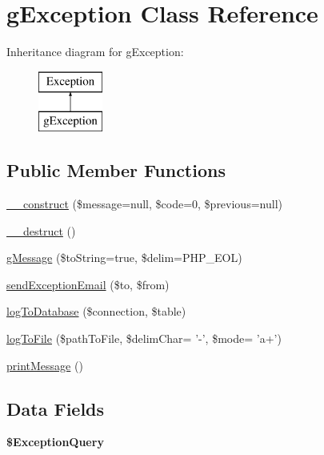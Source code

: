 \hypertarget{classg_exception}{\section{g\-Exception Class Reference}
\label{classg_exception}
}
Inheritance diagram for g\-Exception\-:\begin{figure}[H]
\begin{center}
\leavevmode
\includegraphics[height=2.000000cm]{classg_exception}
\end{center}
\end{figure}
\subsection*{Public Member Functions}
\begin{DoxyCompactItemize}
\item 
\hyperlink{classg_exception_a77206ff4fd1abddfb3db79243b97143a}{\-\_\-\-\_\-construct} (\$message=null, \$code=0, \$previous=null)
\item 
\hyperlink{classg_exception_a421831a265621325e1fdd19aace0c758}{\-\_\-\-\_\-destruct} ()
\item 
\hyperlink{classg_exception_a385de9a5073a5d365e2f21656c46eee5}{g\-Message} (\$to\-String=true, \$delim=P\-H\-P\-\_\-\-E\-O\-L)
\item 
\hyperlink{classg_exception_a3ef664c80085963a2284f0ac6ddf4b25}{send\-Exception\-Email} (\$to, \$from)
\item 
\hyperlink{classg_exception_ae9d329cdadd0257c2bdb78ceab77836c}{log\-To\-Database} (\$connection, \$table)
\item 
\hyperlink{classg_exception_a9f99ac54ac45fe14024ce79054e31687}{log\-To\-File} (\$path\-To\-File, \$delim\-Char= '-\/', \$mode= 'a+')
\item 
\hyperlink{classg_exception_a0831a4e9bbffc32db61190f2a31974f7}{print\-Message} ()
\end{DoxyCompactItemize}
\subsection*{Data Fields}
\begin{DoxyCompactItemize}
\item 
\hypertarget{classg_exception_a110f48f6c2f2e5ffec81a1f22f242302}{{\bfseries \$\-Exception\-Query}}\label{classg_exception_a110f48f6c2f2e5ffec81a1f22f242302}

\end{DoxyCompactItemize}



